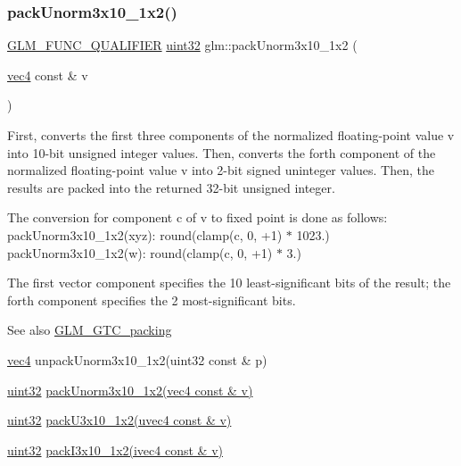 \subsubsection{\texorpdfstring{pack\+Unorm3x10\+\_\+1x2()}{packUnorm3x10\_1x2()}}
{\footnotesize\ttfamily \hyperlink{setup_8hpp_a33fdea6f91c5f834105f7415e2a64407}{G\+L\+M\+\_\+\+F\+U\+N\+C\+\_\+\+Q\+U\+A\+L\+I\+F\+I\+ER} \hyperlink{group__gtc__type__precision_ga202b6a53c105fcb7e531f9b443518451}{uint32} glm\+::pack\+Unorm3x10\+\_\+1x2 (\begin{DoxyParamCaption}\item[{\hyperlink{group__core__types_ga5881b1b022d7fd1b7218f5916532dd02}{vec4} const \&}]{v }\end{DoxyParamCaption})}

First, converts the first three components of the normalized floating-\/point value v into 10-\/bit unsigned integer values. Then, converts the forth component of the normalized floating-\/point value v into 2-\/bit signed uninteger values. Then, the results are packed into the returned 32-\/bit unsigned integer.

The conversion for component c of v to fixed point is done as follows\+: pack\+Unorm3x10\+\_\+1x2(xyz)\+: round(clamp(c, 0, +1) $\ast$ 1023.) pack\+Unorm3x10\+\_\+1x2(w)\+: round(clamp(c, 0, +1) $\ast$ 3.)

The first vector component specifies the 10 least-\/significant bits of the result; the forth component specifies the 2 most-\/significant bits.

\begin{DoxySeeAlso}{See also}
\hyperlink{group__gtc__packing}{G\+L\+M\+\_\+\+G\+T\+C\+\_\+packing} 

\hyperlink{group__core__types_ga5881b1b022d7fd1b7218f5916532dd02}{vec4} unpack\+Unorm3x10\+\_\+1x2(uint32 const \& p) 

\hyperlink{group__gtc__type__precision_ga202b6a53c105fcb7e531f9b443518451}{uint32} \hyperlink{group__gtc__packing_ga2cf2d11b40bd48639110456fd74c2e33}{pack\+Unorm3x10\+\_\+1x2(vec4 const \& v)} 

\hyperlink{group__gtc__type__precision_ga202b6a53c105fcb7e531f9b443518451}{uint32} \hyperlink{group__gtc__packing_gaf656d8862628f96b20de7a36eaa1fe56}{pack\+U3x10\+\_\+1x2(uvec4 const \& v)} 

\hyperlink{group__gtc__type__precision_ga202b6a53c105fcb7e531f9b443518451}{uint32} \hyperlink{group__gtc__packing_ga032e18fa5bc5b8f3897104aeb2f1e195}{pack\+I3x10\+\_\+1x2(ivec4 const \& v)} 
\end{DoxySeeAlso}


